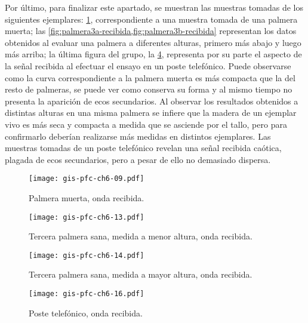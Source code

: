 Por último, para finalizar este apartado, se muestran las muestras tomadas
de los siguientes ejemplares: \cref{fig:palmeramuerta-recibida},
correspondiente a una muestra tomada de una palmera muerta; las
\cref{fig:palmera3a-recibida,fig:palmera3b-recibida} representan los datos
obtenidos al evaluar una palmera a diferentes alturas, primero más abajo y
luego más arriba; la última figura del grupo, la \cref{fig:poste-recibida},
representa por su parte el aspecto de la señal recibida al efectuar el
ensayo en un poste telefónico. Puede observarse como la curva
correspondiente a la palmera muerta es más compacta que la del resto de
palmeras, se puede ver como conserva su forma y al mismo tiempo no presenta
la aparición de ecos secundarios. Al observar los resultados obtenidos a
distintas alturas en una misma palmera se infiere que la madera de un
ejemplar vivo es más seca y compacta a medida que se asciende por el tallo,
pero para confirmarlo deberían realizarse más medidas en distintos
ejemplares. Las muestras tomadas de un poste telefónico revelan una señal
recibida caótica, plagada de ecos secundarios, pero a pesar de ello no
demasiado dispersa.

\begin{figure}
    \begin{center}
	\texttt{[image: gis-pfc-ch6-09.pdf]}
    \end{center}
    \caption[Palmera muerta (onda recibida)]{Palmera muerta, onda
    recibida.}
    \label{fig:palmeramuerta-recibida}
\end{figure}

\begin{figure}
    \begin{center}
	\texttt{[image: gis-pfc-ch6-13.pdf]}
    \end{center}
    \caption[Tercera palmera sana (onda recibida)]{Tercera palmera sana,
    medida a menor altura, onda recibida.}
    \label{fig:palmera3a-recibida}
\end{figure}

\begin{figure}
    \begin{center}
	\texttt{[image: gis-pfc-ch6-14.pdf]}
    \end{center}
    \caption[Tercera palmera sana (onda recibida)]{Tercera palmera sana,
    medida a mayor altura, onda recibida.}
    \label{fig:palmera3b-recibida}
\end{figure}

\begin{figure}
    \begin{center}
	\texttt{[image: gis-pfc-ch6-16.pdf]}
    \end{center}
    \caption[Poste telefónico (onda recibida)]{Poste telefónico, onda
    recibida.}
    \label{fig:poste-recibida}
\end{figure}


